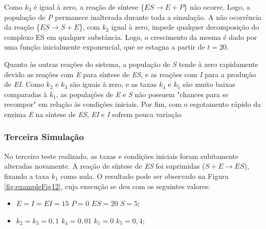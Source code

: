\documentclass[a4paper, 12pt]{article}
\begin{document}
Como \(k_3\) é igual à zero, a reação de síntese \{\(ES \rightarrow E + P\)\} não ocorre. Logo, a população de \emph{P} permanece inalterada durante toda a simulação. A não ocorrência da reação \{\(ES \rightarrow S + E\)\}, com \(k_2\) igual à zero, impede qualquer decomposição do complexo ES em qualquer substância. Logo, o crescimento da mesma é dado por uma função inicialmente exponencial, que se estagna a partir de \(t = 20\).

Quanto às outras reações do sistema, a população de \emph{S} tende à zero rapidamente devido as reações com \emph{E} para síntese de \emph{ES}, e as reações com \emph{I} para a produção de \emph{EI}. Como \(k_2\) e \(k_3\) são iguais à zero, e as taxas \(k_4\) e \(k_5\) são muito baixas comparadas à \(k_1\), as populações de \emph{E} e \emph{S} não possuem "chances para se recompor" em relação às condições iniciais. Por fim, com o esgotamento rápido da enzima \emph{E} na síntese de \emph{ES}, \emph{EI} e \emph{I} sofrem pouca variação

\subsubsection*{Terceira Simulação}

No terceiro teste realizado, as taxas e condições iniciais foram subitamente alteradas novamente. A reação de síntese de \emph{ES} foi suprimidas (\(S + E \rightarrow ES\)), fixando a taxa \(k_1\) como nula. O resultado pode ser observado na Figura \ref{fig:exampleFig12}, cuja execução se deu com os seguintes valores:

\begin{itemize}
    \item \(E = I = EI = 15\) \hspace{0.1cm}\textbar\hspace{0.1cm} \(P = 0\) \hspace{0.1cm}\textbar\hspace{0.1cm} \(ES = 20\) \hspace{0.1cm}\textbar\hspace{0.1cm} \(S = 5\);
    \item \(k_2 = k_3 = 0,1\) \hspace{0.1cm}\textbar\hspace{0.1cm} \(k_4 = 0,01\) \hspace{0.1cm}\textbar\hspace{0.1cm} \(k_1 = 0\) \hspace{0.1cm}\textbar\hspace{0.1cm} \(k_5 = 0,4\);
\end{itemize}
\end{document}
